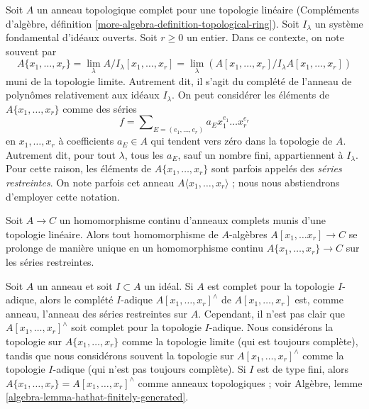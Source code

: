 \noindent
Soit $A$ un anneau topologique complet pour une
topologie linéaire (Compléments d'algèbre, définition
\ref{more-algebra-definition-topological-ring}).
Soit $I_\lambda$ un système fondamental d'idéaux ouverts.
Soit $r \geq 0$ un entier. Dans ce contexte, on note souvent
par
$$
A\{x_1, \ldots, x_r\} =
\lim_\lambda A/I_\lambda[x_1, \ldots, x_r] =
\lim_\lambda (A[x_1, \ldots, x_r]/I_\lambda A[x_1, \ldots, x_r])
$$
muni de la topologie limite. Autrement dit, il s'agit
du complété de l'anneau de polynômes relativement aux
idéaux $I_\lambda$. On peut considérer les éléments de $A\{x_1, \ldots, x_r\}$ comme des
séries
$$
f = \sum\nolimits_{E = (e_1, \ldots, e_r)} a_E x_1^{e_1} \ldots x_r^{e_r}
$$
en $x_1, \ldots, x_r$ à coefficients $a_E \in A$ qui tendent
vers zéro dans la topologie de $A$. Autrement dit, pour tout $\lambda$,
tous les $a_E$, sauf un nombre fini, appartiennent à $I_\lambda$.
Pour cette raison, les éléments de $A\{x_1, \ldots, x_r\}$ sont parfois
appelés des {\it séries restreintes}.
On note parfois cet anneau $A\langle x_1, \ldots, x_r\rangle$ ;
nous nous abstiendrons d'employer cette notation.

\begin{remark}
\label{remark-universal-property}
\begin{reference}
\cite[Chapter 0, 7.5.3]{EGA}
\end{reference}
Soit $A \to C$ un homomorphisme continu d'anneaux complets munis d'une topologie linéaire.
Alors tout homomorphisme de $A$-algèbres $A[x_1, \ldots x_r] \to C$ se prolonge de manière unique en un
homomorphisme continu $A\{x_1, \ldots, x_r\} \to C$ sur les séries restreintes.
\end{remark}

\begin{remark}
\label{remark-I-adic-completion-and-restricted-power-series}
Soit $A$ un anneau et soit $I \subset A$ un idéal. Si $A$ est complet pour la topologie
$I$-adique, alors le complété $I$-adique $A[x_1, \ldots, x_r]^\wedge$ de
$A[x_1, \ldots, x_r]$ est, comme anneau, l'anneau des séries restreintes sur $A$.
Cependant, il n'est pas clair que $A[x_1, \ldots, x_r]^\wedge$ soit complet pour la topologie
$I$-adique. Nous considérons la topologie sur $A\{x_1, \ldots, x_r\}$
comme la topologie limite (qui est toujours complète), tandis que nous considérons souvent
la topologie sur $A[x_1, \ldots, x_r]^\wedge$ comme la topologie $I$-adique
(qui n'est pas toujours complète). Si $I$ est de type fini, alors
$A\{x_1, \ldots, x_r\} = A[x_1, \ldots, x_r]^\wedge$ comme anneaux topologiques ;
voir Algèbre, lemme \ref{algebra-lemma-hathat-finitely-generated}.
\end{remark}





